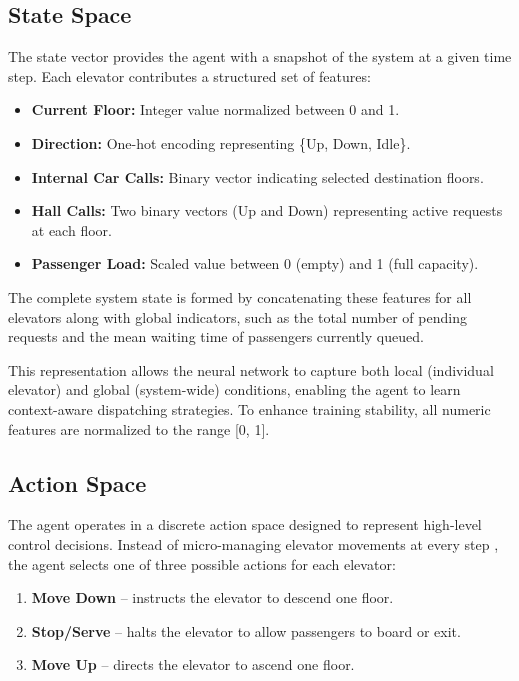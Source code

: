 \documentclass[conference]{IEEEtran}
\begin{document}
\subsection{State Space}
The state vector provides the agent with a snapshot of the system at a given time step. Each elevator contributes a structured set of features\cite{fan2019application, luo2020deep}:
\begin{itemize}
    \item \textbf{Current Floor:} Integer value normalized between 0 and 1.
    \item \textbf{Direction:} One-hot encoding representing \{Up, Down, Idle\}.
    \item \textbf{Internal Car Calls:} Binary vector indicating selected destination floors.
    \item \textbf{Hall Calls:} Two binary vectors (Up and Down) representing active requests at each floor.
    \item \textbf{Passenger Load:} Scaled value between 0 (empty) and 1 (full capacity).
\end{itemize}
The complete system state is formed by concatenating these features for all elevators along with global indicators, such as the total number of pending requests and the mean waiting time of passengers currently queued.

This representation allows the neural network to capture both local (individual elevator) and global (system-wide) conditions, enabling the agent to learn context-aware dispatching strategies. To enhance training stability, all numeric features are normalized to the range [0, 1].

\subsection{Action Space}
The agent operates in a discrete action space designed to represent high-level control decisions. Instead of micro-managing elevator movements at every step \cite{luo2020deep}, the agent selects one of three possible actions for each elevator:
\begin{enumerate}
    \item \textbf{Move Down} – instructs the elevator to descend one floor.
    \item \textbf{Stop/Serve} – halts the elevator to allow passengers to board or exit.
    \item \textbf{Move Up} – directs the elevator to ascend one floor.
\end{enumerate}
\end{document}
